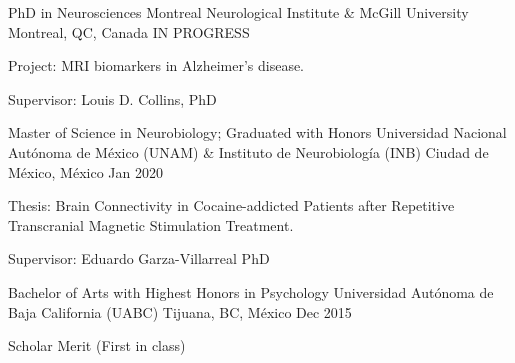 \begin{cventries}
    \cventry
        {PhD in Neurosciences}
        {Montreal Neurological Institute \& McGill University}
        {Montreal, QC, Canada}
        {IN PROGRESS}
        {
            \begin{cvitems}
                \item {Project: MRI biomarkers in Alzheimer's disease.}
                \item {Supervisor: Louis D. Collins, PhD}
            \end{cvitems}
        }
    \cventry
        {Master of Science in Neurobiology; Graduated with Honors}
        {Universidad Nacional Autónoma de México (UNAM) \& Instituto de
        Neurobiología (INB)}
        {Ciudad de México, México}
        {Jan 2020}
        {
            \begin{cvitems}
                \item {Thesis: Brain Connectivity in Cocaine-addicted Patients after Repetitive Transcranial Magnetic Stimulation Treatment.}
                \item {Supervisor: Eduardo Garza-Villarreal PhD}
            \end{cvitems}
        }
    \cventry
        {Bachelor of Arts with Highest Honors in Psychology}
        {Universidad Autónoma de Baja California (UABC)}
        {Tijuana, BC, México}
        {Dec 2015}
        {
            \begin{cvitems}
                \item {Scholar Merit (First in class)}
            \end{cvitems}
        }
\end{cventries}
